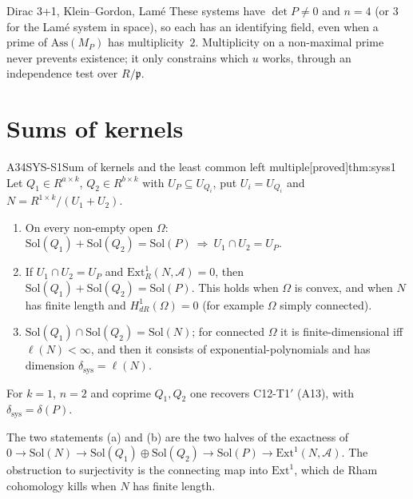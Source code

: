 \documentclass[11pt,a4paper,oneside]{report}
\newcommand{\badge}[2]{\textcolor{#1}{\textsf{\footnotesize[#2]}}}
\newcommand{\proved}{\badge{cC}{proved}}
\newenvironment{dimcard}[5]{\par\Needspace{12\baselineskip}\begin{dimcardbox}{#1}{#2}{#3}{#4}{#5}}{\end{dimcardbox}}
\begin{document}
\begin{example}{Dirac 3+1, Klein--Gordon, Lam\'e}
These systems have $\det P\ne0$ and $n=4$ (or $3$ for the Lam\'e system in space), so each has an identifying field, even when a prime of $\mathrm{Ass}(M_P)$ has multiplicity~$2$. Multiplicity on a non-maximal prime never prevents existence; it only constrains which $u$ works, through an independence test over $R/\mathfrak p$.
\end{example}

\section{Sums of kernels}

\begin{dimcard}{A34}{SYS-S1}{Sum of kernels and the least common left multiple}{\proved}{thm:syss1}
Let $Q_1\in R^{a\times k}$, $Q_2\in R^{b\times k}$ with $U_P\subseteq U_{Q_i}$, put $U_i=U_{Q_i}$ and $N=R^{1\times k}/(U_1+U_2)$.
\begin{enumerate}[label=(\alph*)]
\item On every non-empty open $\Omega$: $\mathrm{Sol}(Q_1)+\mathrm{Sol}(Q_2)=\mathrm{Sol}(P)\ \Rightarrow\ U_1\cap U_2=U_P$.
\item If $U_1\cap U_2=U_P$ and $\mathrm{Ext}^1_R(N,\mathcal A)=0$, then $\mathrm{Sol}(Q_1)+\mathrm{Sol}(Q_2)=\mathrm{Sol}(P)$. This holds when $\Omega$ is convex, and when $N$ has finite length and $H^1_{dR}(\Omega)=0$ (for example $\Omega$ simply connected).
\item $\mathrm{Sol}(Q_1)\cap\mathrm{Sol}(Q_2)=\mathrm{Sol}(N)$; for connected $\Omega$ it is finite-dimensional iff $\ell(N)<\infty$, and then it consists of exponential-polynomials and has dimension $\delta_{\mathrm{sys}}=\ell(N)$.
\end{enumerate}
For $k=1$, $n=2$ and coprime $Q_1,Q_2$ one recovers C12-T1$'$ (A13), with $\delta_{\mathrm{sys}}=\delta(P)$.
\end{dimcard}

\begin{proofidea}
The two statements (a) and (b) are the two halves of the exactness of $0\to\mathrm{Sol}(N)\to\mathrm{Sol}(Q_1)\oplus\mathrm{Sol}(Q_2)\to\mathrm{Sol}(P)\to\mathrm{Ext}^1(N,\mathcal A)$. The obstruction to surjectivity is the connecting map into $\mathrm{Ext}^1$, which de Rham cohomology kills when $N$ has finite length.
\end{proofidea}
\end{document}
